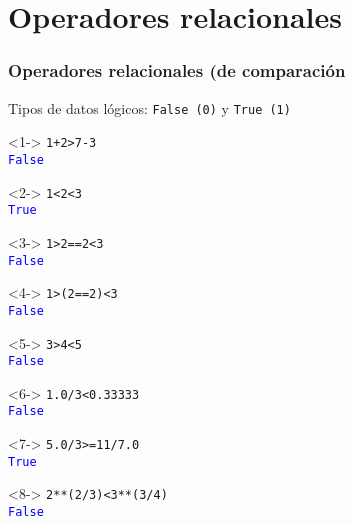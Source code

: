 \documentclass[12pt]{beamer}
\begin{document}
\section{Operadores relacionales}
\begin{frame}[fragile]
\frametitle{Operadores relacionales (de comparaci\'{o}n}
Tipos de datos l\'{o}gicos: \texttt{False (0)} y \texttt{True (1)}
\begin{minipage}{5.5cm}
\begin{exampleblock}{}<1->
	\verb|1+2>7-3| \\
	\pause
	\textcolor{blue}{\texttt{False}}
\end{exampleblock}
\begin{exampleblock}{}<2->
	\verb|1<2<3| \\
	\pause
	\textcolor{blue}{\texttt{True}}
\end{exampleblock}
\begin{exampleblock}{}<3->
	\verb|1>2==2<3| \\
	\pause
	\textcolor{blue}{\texttt{False}}
\end{exampleblock}
\begin{exampleblock}{}<4->
	\verb|1>(2==2)<3| \\
	\pause
	\textcolor{blue}{\texttt{False}}
\end{exampleblock}
\end{minipage}
\hspace{0.5cm}
\begin{minipage}{5.5cm}
\begin{exampleblock}{}<5->
	\verb|3>4<5| \\
	\pause
	\textcolor{blue}{\texttt{False}}
\end{exampleblock}
\begin{exampleblock}{}<6->
	\verb|1.0/3<0.33333| \\
	\pause
	\textcolor{blue}{\texttt{False}}
\end{exampleblock}
\begin{exampleblock}{}<7->
	\verb|5.0/3>=11/7.0| \\
	\pause
	\textcolor{blue}{\texttt{True}}
\end{exampleblock}
\begin{exampleblock}{}<8->
	\verb|2**(2/3)<3**(3/4)| \\
	\pause
	\textcolor{blue}{\texttt{False}}
\end{exampleblock}
\end{minipage}
\end{frame}
\end{document}
